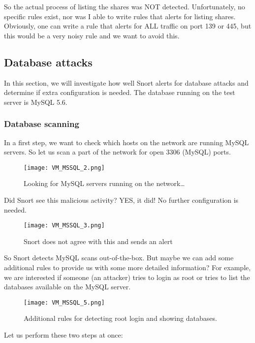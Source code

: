 So the actual process of listing the shares was NOT detected. Unfortunately, no specific rules exist, nor was I able to write rules that alerts for listing shares. Obviously, one can write a rule that alerts for ALL traffic on port 139 or 445, but this would be a very noisy rule and we want to avoid this.

\clearpage

\subsection{Database attacks}

In this section, we will investigate how well Snort alerts for database attacks and determine if extra configuration is needed. The database running on the test server is MySQL 5.6.

\subsubsection{Database scanning}

In a first step, we want to check which hosts on the network are running MySQL servers. So let us scan a part of the network for open 3306 (MySQL) ports.

\begin{figure}[h]
    \centering
    \texttt{[image: VM\_MSSQL\_2.png]}
    \caption{Looking for MySQL servers running on the network\ldots}
\end{figure}

Did Snort see this malicious activity? YES, it did! No further configuration is needed.
\begin{figure}[h]
    \centering
    \texttt{[image: VM\_MSSQL\_3.png]}
    \caption{Snort does not agree with this and sends an alert}
\end{figure}

So Snort detects MySQL scans out-of-the-box. But maybe we can add some additional rules to provide us with some more detailed information? For example, we are interested if someone (an attacker) tries to login as root or tries to list the databases available on the MySQL server.
\begin{figure}[h]
    \centering
    \texttt{[image: VM\_MSSQL\_5.png]}
    \caption{Additional rules for detecting root login and showing databases.}
\end{figure}

Let us perform these two steps at once:

